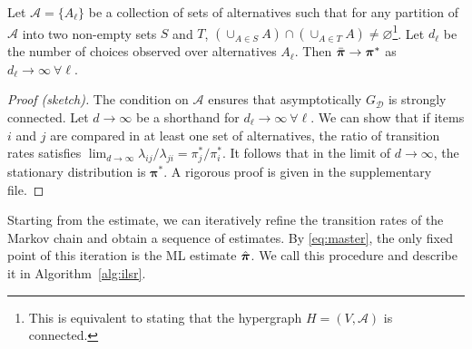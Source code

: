 \begin{theorem}
\label{thm:consistency}
Let $\mathcal{A} = \{ A_\ell \}$ be a collection of sets of alternatives such that for any partition of $\mathcal{A}$ into two non-empty sets $S$ and $T$, $\left( \cup_{A \in S} A \right) \cap \left( \cup_{A \in T} A \right) \ne \varnothing$\footnote{
This is equivalent to stating that the hypergraph $H = (V, \mathcal{A})$ is connected.
}.
Let $d_\ell$ be the number of choices observed over alternatives $A_\ell$.
Then $\bar{\bm{\pi}} \to \bm{\pi}^*$ as $d_\ell \to \infty \ \forall \ell$.
\end{theorem}

\vspace{-0.3cm}
\begin{proof}[Proof (sketch)]
The condition on $\mathcal{A}$ ensures that asymptotically $G_{\mathcal{D}}$ is strongly connected.
Let $d \to \infty$ be a shorthand for $d_\ell \to \infty \ \forall \ell$.
We can show that if items $i$ and $j$ are compared in at least one set of alternatives, the ratio of transition rates satisfies $\lim_{d \to \infty} \lambda_{ij} / \lambda_{ji} = \pi^*_j / \pi^*_i$.
It follows that in the limit of $d \to \infty$, the stationary distribution is $\bm{\pi}^*$.
A rigorous proof is given in the supplementary file.
\end{proof}

Starting from the \LSR{} estimate, we can iteratively refine the transition rates of the Markov chain and obtain a sequence of estimates.
By \eqref{eq:master}, the only fixed point of this iteration is the ML estimate $\hat{\bm{\pi}}$.
We call this procedure \ILSR{} and describe it in Algorithm~\ref{alg:ilsr}.


